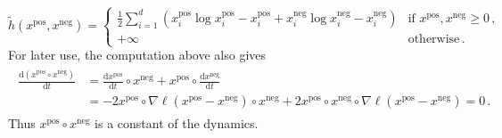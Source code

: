 \documentclass[11pt,english,reqno]{article}
\newcommand{\diff}{\mathrm{d}}
\newcommand{\pos}{\text{pos}}
\renewcommand{\neg}{\text{neg}}
\renewcommand{\geq}{\geqslant}
\theoremstyle{plain}
\theoremstyle{definition}
\theoremstyle{remark}
\numberwithin{equation}{section}
\begin{document}
\begin{equation*}
	\widetilde{h}(x^\pos, x^\neg) = \begin{cases}
		\frac{1}{2} \sum_{i=1}^d \left(x^\pos_i \log x^\pos_i - x^\pos_i + x^\neg_i \log x^\neg_i - x^\neg_i\right) & \text{if } x^\pos, x^\neg \geq 0 \, , \\
		+\infty & \text{otherwise} \, .
	\end{cases}
\end{equation*} 
For later use, the computation above also gives
\begin{align}
	\label{eq:cst-product}
	\begin{split}
	\frac{\diff(x^\pos\circ x^\neg)}{\diff t} &= \frac{\diff x^\pos}{\diff t} \circ x^\neg + x^\pos \circ \frac{\diff x^\neg}{\diff t} \\
	&= -2 x^\pos \circ \nabla \ell(x^\pos - x^\neg) \circ x^\neg + 2 x^\pos \circ x^\neg \circ \nabla \ell(x^\pos - x^\neg) = 0 \, .
	\end{split}
\end{align}
Thus $x^\pos \circ x^\neg$ is a constant of the dynamics.
\end{document}
